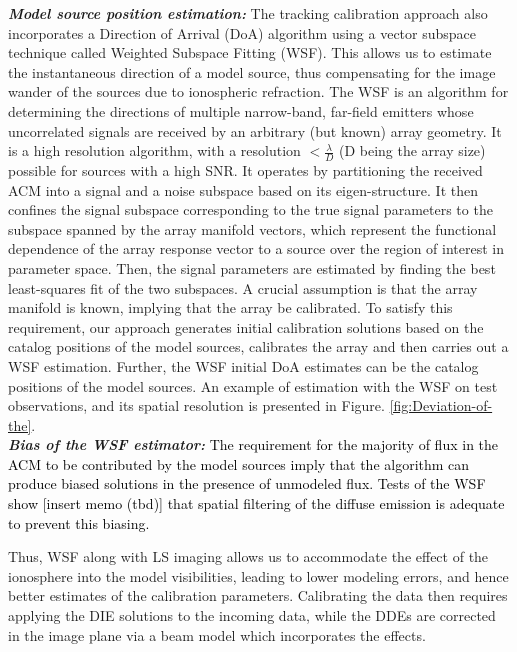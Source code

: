 \documentclass{aa}
\begin{document}
\textbf{\emph{Model source position estimation:}}\emph{ }The tracking
calibration approach also incorporates a Direction of Arrival (DoA)
algorithm using a vector subspace technique called Weighted Subspace
Fitting (WSF)\citep{viberg1991detection}. This allows us to estimate
the instantaneous direction of a model source, thus compensating for
the image wander of the sources due to ionospheric refraction. The
WSF is an algorithm for determining the directions of multiple narrow-band,
far-field emitters whose uncorrelated signals are received by an arbitrary
(but known) array geometry. It is a high resolution algorithm, with
a resolution $<\frac{\lambda}{D}$ (D being the array size) possible
for sources with a high SNR. It operates by partitioning the received
ACM into a signal and a noise subspace based on its eigen-structure.
It then confines the signal subspace corresponding to the true signal
parameters to the subspace spanned by the array manifold vectors,
which represent the functional dependence of the array response vector
to a source over the region of interest in parameter space. Then,
the signal parameters are estimated by finding the best least-squares
fit of the two subspaces. A crucial assumption is that the array manifold
is known, implying that the array be calibrated. To satisfy this requirement,
our approach generates initial calibration solutions based on the
catalog positions of the model sources, calibrates the array and then
carries out a WSF estimation. Further, the WSF initial DoA estimates
can be the catalog positions of the model sources. An example of estimation
with the WSF on test observations, and its spatial resolution is presented
in Figure. \ref{fig:Deviation-of-the}.\\
\textbf{\emph{Bias of the WSF estimator:}} \textcolor{black}{The requirement
for the majority of flux in the ACM to be contributed by the model
sources imply that the algorithm can produce biased solutions in the
presence of unmodeled flux. Tests of the WSF show {[}insert memo (tbd){]}
that spatial filtering of the diffuse emission is adequate to prevent
this biasing.}

Thus, WSF along with LS imaging allows us to accommodate the effect
of the ionosphere into the model visibilities, leading to lower modeling
errors, and hence better estimates of the calibration parameters.
Calibrating the data then requires applying the DIE solutions to the
incoming data, while the DDEs are corrected in the image plane via
a beam model which incorporates the effects.
\end{document}
